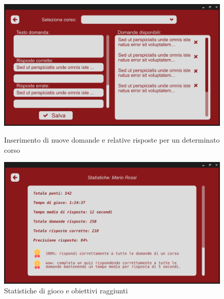         \begin{figure}[H]
          \centering
          \begin{minipage}[b]{0.48\textwidth}
            \includegraphics[width=\textwidth]{Images/mockup/import3.png}
            \caption{Inserimento di nuove domande e relative risposte per un determinato corso}
            \label{fig:import3}
          \end{minipage}
          \hfill
          \begin{minipage}[b]{0.48\textwidth}
            \includegraphics[width=\textwidth]{Images/mockup/achievements3.png}
            \caption{Statistiche di gioco e obiettivi raggiunti}
            \label{fig:achievements3}
          \end{minipage}
        \end{figure}

